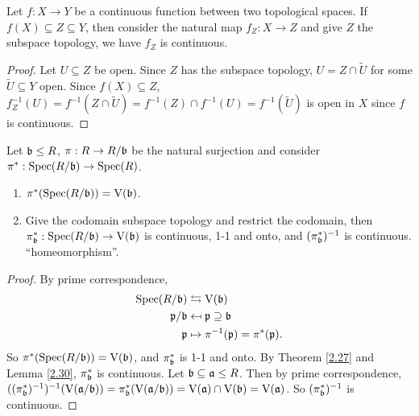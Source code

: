 \begin{lemma}\label{2.30}
    Let $f: X \to Y$ be a continuous function between two topological spaces. If $f(X) \subseteq Z \subseteq Y$, then consider the natural map $f_Z: X \to Z$ and give $Z$ the subspace topology, we have $f_Z$ is continuous.
\end{lemma}

\begin{proof}
    Let $U \subseteq Z$ be open. Since $Z$ has the subspace topology, $U = Z \cap \widetilde U$ for some $\widetilde U \subseteq Y$ open. Since $f(X) \subseteq Z$, $f_Z^{-1}(U) = f^{-1}(Z \cap \widetilde U) = f^{-1}(Z) \cap f^{-1}(U) = f^{-1}(\widetilde U)$ is open in $X$ since $f$ is continuous.
\end{proof}

\begin{theorem}\label{2.31}
    Let $\mathfrak{b} \leq R$, $\pi: R \to R/\mathfrak{b}$ be the natural surjection and consider $\pi^*: \operatorname{Spec}(R/\mathfrak{b}) \to \operatorname{Spec}(R)$.
    \begin{enumerate}
        \item $\pi^*(\operatorname{Spec}(R/\mathfrak{b})) = \operatorname{V}(\mathfrak{b})$.
        \item Give the codomain subspace topology and restrict the codomain, then $\pi_{\mathfrak{b}}^*: \operatorname{Spec}(R/\mathfrak{b}) \to \operatorname{V}(\mathfrak{b})$ is continuous, 1-1 and onto, and $(\pi_{\mathfrak{b}}^*)^{-1}$ is continuous. ``homeomorphism''.
    \end{enumerate}
\end{theorem}

\begin{proof}
    By prime correspondence, 
    \begin{align*}
        \operatorname{Spec}(R/\mathfrak{b}) &\leftrightarrows \operatorname{V}(\mathfrak{b}) \\
        \mathfrak{p}/\mathfrak{b} &\mapsfrom \mathfrak{p} \supseteq \mathfrak{b} \\
        \mathfrak{p} &\mapsto \pi^{-1}(\mathfrak{p}) = \pi^*(\mathfrak{p}).
    \end{align*}
    So $\pi^*(\operatorname{Spec}(R/\mathfrak{b})) = \operatorname{V}(\mathfrak{b})$, and $\pi_{\mathfrak{b}}^*$ is 1-1 and onto. By Theorem \ref{2.27} and Lemma \ref{2.30}, $\pi_{\mathfrak{b}}^*$ is continuous. Let $\mathfrak{b} \subseteq \mathfrak{a} \leq R$. Then by prime correspondence, $((\pi_{\mathfrak{b}}^*)^{-1})^{-1}(\operatorname{V}(\mathfrak{a}/\mathfrak{b})) = \pi_{\mathfrak{b}}^*(\operatorname{V}(\mathfrak{a}/\mathfrak{b})) = \operatorname{V}(\mathfrak{a}) \cap \operatorname{V}(\mathfrak{b}) = \operatorname{V}(\mathfrak{a})$. So $(\pi_{\mathfrak{b}}^*)^{-1}$ is continuous.
\end{proof}


